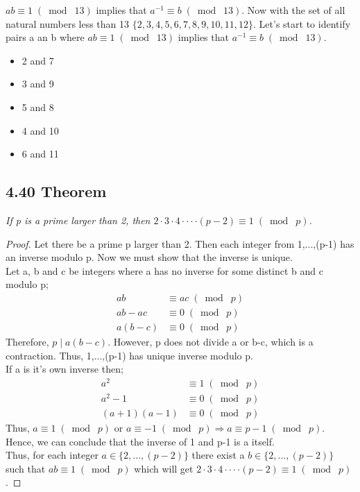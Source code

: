\documentclass{article}
\begin{document}
$ab \equiv 1 \;(\bmod\; 13)$ implies that $a^{-1} \equiv b \;(\bmod\; 13)$. Now with the set of all natural numbers less than 13 $\{2,3,4,5,6,7,8,9,10,11,12\}$. Let's start to identify pairs a an b where $ab \equiv 1 \;(\bmod\; 13)$ implies that $a^{-1} \equiv b \;(\bmod\; 13)$.
\begin{itemize}
    \item 2 and 7
    \item 3 and 9
    \item 5 and 8
    \item 4 and 10
    \item 6 and 11
\end{itemize}

\subsection*{4.40 Theorem} 
\quad \textit{If p is a prime larger than 2, then $2 \cdot 3 \cdot 4 \cdot\cdot\cdot\cdot(p-2) \equiv 1 \;(\bmod\; p)$.}

\begin{proof}
Let there be a prime p larger than 2. Then each integer from 1,...,(p-1) has an inverse modulo p. Now we must show that the inverse is unique.\\
Let a, b and c be integers where a has no inverse for some distinct b and c modulo p;
\begin{align*}
    && ab &\equiv ac \;(\bmod\; p)&&\\
    && ab - ac &\equiv 0 \;(\bmod\; p)&&\\
    && a(b - c) &\equiv 0 \;(\bmod\; p)&&
\end{align*}
Therefore, $p \mid a(b-c)$. However, p does not divide a or b-c, which is a contraction. Thus, 1,...,(p-1) has unique inverse modulo p.\\
If a is it's own inverse then;
\begin{align*}
    && a^2 &\equiv 1 \;(\bmod\; p)&&\\
    && a^2-1 &\equiv 0 \;(\bmod\; p)&&\\
    && (a+1)(a-1) &\equiv 0 \;(\bmod\; p)&&
\end{align*}
Thus, $a \equiv 1 \;(\bmod\; p)$ or $a \equiv -1 \;(\bmod\; p) \Longrightarrow a \equiv p-1 \;(\bmod\; p)$. Hence, we can conclude that the inverse of 1 and p-1 is a itself.\\
Thus, for each integer $a \in \{2,...,(p-2)\}$ there exist a $b \in \{2,...,(p-2)\}$ such that $ab\equiv 1 \;(\bmod\; p)$ which will get $2 \cdot 3 \cdot 4 \cdot\cdot\cdot\cdot(p-2) \equiv 1 \;(\bmod\; p)$.
\end{proof}
\end{document}
